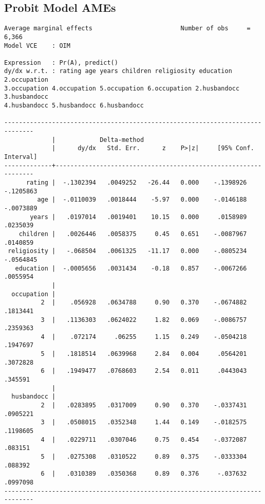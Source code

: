 \documentclass{article}
\begin{document}
\newpage
\hypertarget{probitame}{\subsection*{Probit Model AMEs}}
\begin{verbatim}
Average marginal effects                        Number of obs     =      6,366
Model VCE    : OIM

Expression   : Pr(A), predict()
dy/dx w.r.t. : rating age years children religiosity education 2.occupation 
3.occupation 4.occupation 5.occupation 6.occupation 2.husbandocc 3.husbandocc 
4.husbandocc 5.husbandocc 6.husbandocc

------------------------------------------------------------------------------
             |            Delta-method
             |      dy/dx   Std. Err.      z    P>|z|     [95% Conf. Interval]
-------------+----------------------------------------------------------------
      rating |  -.1302394   .0049252   -26.44   0.000    -.1398926   -.1205863
         age |  -.0110039   .0018444    -5.97   0.000    -.0146188   -.0073889
       years |   .0197014   .0019401    10.15   0.000     .0158989    .0235039
    children |   .0026446   .0058375     0.45   0.651    -.0087967    .0140859
 religiosity |   -.068504   .0061325   -11.17   0.000    -.0805234   -.0564845
   education |  -.0005656   .0031434    -0.18   0.857    -.0067266    .0055954
             |
  occupation |
          2  |    .056928   .0634788     0.90   0.370    -.0674882    .1813441
          3  |   .1136303   .0624022     1.82   0.069    -.0086757    .2359363
          4  |    .072174     .06255     1.15   0.249    -.0504218    .1947697
          5  |   .1818514   .0639968     2.84   0.004     .0564201    .3072828
          6  |   .1949477   .0768603     2.54   0.011     .0443043     .345591
             |
  husbandocc |
          2  |   .0283895   .0317009     0.90   0.370    -.0337431    .0905221
          3  |   .0508015   .0352348     1.44   0.149    -.0182575    .1198605
          4  |   .0229711   .0307046     0.75   0.454    -.0372087     .083151
          5  |   .0275308   .0310522     0.89   0.375    -.0333304     .088392
          6  |   .0310389   .0350368     0.89   0.376     -.037632    .0997098
------------------------------------------------------------------------------
\end{verbatim}
\end{document}
